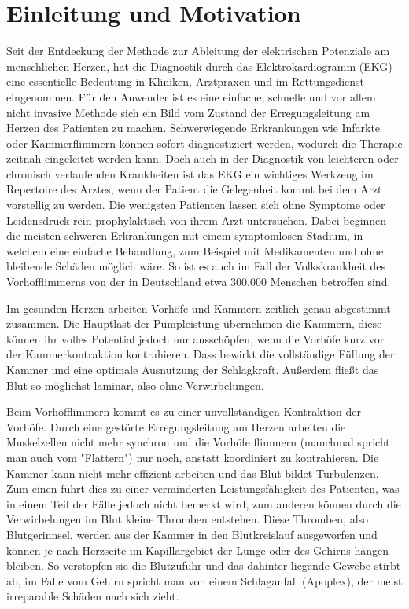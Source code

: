 
\section{Einleitung und Motivation}

Seit der Entdeckung der Methode zur Ableitung der elektrischen Potenziale am menschlichen Herzen, hat die Diagnostik durch das Elektrokardiogramm (EKG) eine essentielle Bedeutung in Kliniken, Arztpraxen und im Rettungsdienst eingenommen. Für den Anwender ist es eine einfache, schnelle und vor allem nicht invasive Methode sich ein Bild vom Zustand der Erregungsleitung am Herzen des Patienten zu machen. Schwerwiegende Erkrankungen wie Infarkte oder Kammerflimmern können sofort diagnostiziert werden, wodurch die Therapie zeitnah eingeleitet werden kann. Doch auch in der Diagnostik von leichteren oder chronisch verlaufenden Krankheiten ist das EKG ein wichtiges Werkzeug im Repertoire des Arztes, wenn der Patient die Gelegenheit kommt bei dem Arzt vorstellig zu werden. Die wenigsten Patienten lassen sich ohne Symptome oder Leidensdruck rein prophylaktisch von ihrem Arzt untersuchen. Dabei beginnen die meisten schweren Erkrankungen mit einem symptomlosen Stadium, in welchem eine einfache Behandlung, zum Beispiel mit Medikamenten und ohne bleibende Schäden möglich wäre. So ist es auch im Fall der Volkskrankheit des Vorhofflimmerns von der in Deutschland etwa 300.000 Menschen betroffen sind. 

Im gesunden Herzen arbeiten Vorhöfe und Kammern zeitlich genau abgestimmt zusammen. Die Hauptlast der Pumpleistung übernehmen die Kammern, diese können ihr volles Potential jedoch nur ausschöpfen, wenn die Vorhöfe kurz vor der Kammerkontraktion kontrahieren. Dass bewirkt die vollständige Füllung der Kammer und eine optimale Ausnutzung der Schlagkraft. Außerdem fließt das Blut so möglichst laminar, also ohne Verwirbelungen. 

Beim Vorhofflimmern kommt es zu einer unvollständigen Kontraktion der Vorhöfe. Durch eine gestörte Erregungsleitung am Herzen arbeiten die Muskelzellen nicht mehr synchron und die Vorhöfe flimmern (manchmal spricht man auch vom "Flattern") nur noch, anstatt koordiniert zu kontrahieren. Die Kammer kann nicht mehr effizient arbeiten und das Blut bildet Turbulenzen. Zum einen führt dies zu einer verminderten Leistungsfähigkeit des Patienten, was in einem Teil der Fälle jedoch nicht bemerkt wird, zum anderen können durch die Verwirbelungen im Blut kleine Thromben entstehen. Diese Thromben, also Blutgerinnsel, werden aus der Kammer in den Blutkreislauf ausgeworfen und können je nach Herzseite im Kapillargebiet der Lunge oder des Gehirns hängen bleiben. So verstopfen sie die Blutzufuhr und das dahinter liegende Gewebe stirbt ab, im Falle vom Gehirn spricht man von einem Schlaganfall (Apoplex), der meist irreparable Schäden nach sich zieht. 

